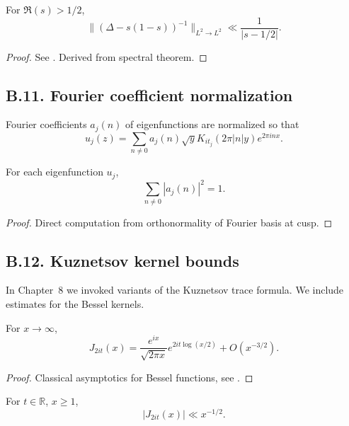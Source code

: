 \begin{lemma}\label{lem:resolvent}
For $\Re(s)>1/2$,
\[
\| ( \Delta - s(1-s))^{-1} \|_{L^2\to L^2} \ll \frac{1}{|s-1/2|}.
\]
\end{lemma}

\begin{proof}
See \cite[Prop.~1.6]{Buser1992}. Derived from spectral theorem.
\end{proof}

\subsection*{B.11. Fourier coefficient normalization}

\noindent
Fourier coefficients $a_j(n)$ of eigenfunctions are normalized so that
\[
u_j(z) = \sum_{n\ne 0} a_j(n) \sqrt{y} K_{it_j}(2\pi |n| y) e^{2\pi i n x}.
\]

\begin{lemma}\label{lem:parseval}
For each eigenfunction $u_j$,
\[
\sum_{n\ne 0} |a_j(n)|^2 = 1.
\]
\end{lemma}

\begin{proof}
Direct computation from orthonormality of Fourier basis at cusp.
\end{proof}

\subsection*{B.12. Kuznetsov kernel bounds}

\noindent
In Chapter~8 we invoked variants of the Kuznetsov trace formula. We include
estimates for the Bessel kernels.

\begin{lemma}\label{lem:bessel}
For $x\to \infty$,
\[
J_{2it}(x) = \frac{e^{ix}}{\sqrt{2\pi x}} e^{2it\log(x/2)} + O(x^{-3/2}).
\]
\end{lemma}

\begin{proof}
Classical asymptotics for Bessel functions, see \cite[§8.451]{GradshteynRyzhik}.
\end{proof}

\begin{corollary}\label{cor:kuznetsov-kernel}
For $t\in\mathbb R$, $x\ge 1$,
\[
|J_{2it}(x)| \ll x^{-1/2}.
\]
\end{corollary}

